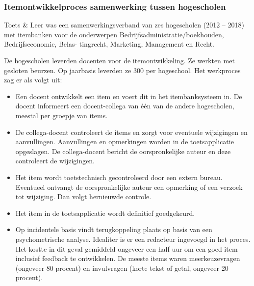 \documentclass[
]{book}
\providecommand{\tightlist}{%
  \setlength{\itemsep}{0pt}\setlength{\parskip}{0pt}}
\begin{document}
\hypertarget{itemontwikkelproces-samenwerking-tussen-hogescholen}{%
\subsubsection{Itemontwikkelproces samenwerking tussen hogescholen}\label{itemontwikkelproces-samenwerking-tussen-hogescholen}}

Toets \& Leer was een samenwerkingsverband van zes hogescholen (2012 -- 2018) met itembanken voor de onderwerpen Bedrijfsadministratie/boekhouden, Bedrijfseconomie, Belas- tingrecht, Marketing, Management en Recht.

De hogescholen leverden docenten voor de itemontwikkeling. Ze werkten met gesloten beurzen. Op jaarbasis leverden ze 300 per hogeschool. Het werkproces zag er als volgt uit:

\begin{itemize}
\tightlist
\item
  Een docent ontwikkelt een item en voert dit in het itembanksysteem in. De docent informeert een docent-collega van één van de andere hogescholen, meestal per groepje van items.
\item
  De collega-docent controleert de items en zorgt voor eventuele wijzigingen en aanvullingen. Aanvullingen en opmerkingen worden in de toetsapplicatie opgeslagen. De collega-docent bericht de oorspronkelijke auteur en deze controleert de wijzigingen.
\item
  Het item wordt toetstechnisch gecontroleerd door een extern bureau. Eventueel ontvangt de oorspronkelijke auteur een opmerking of een verzoek tot wijziging. Dan volgt hernieuwde controle.
\item
  Het item in de toetsapplicatie wordt definitief goedgekeurd.
\item
  Op incidentele basis vindt terugkoppeling plaats op basis van een psychometrische analyse.
  Idealiter is er een redacteur ingevoegd in het proces. Het kostte in dit geval gemiddeld ongeveer een half uur om een goed item inclusief feedback te ontwikkelen. De meeste items waren meerkeuzevragen (ongeveer 80 procent) en invulvragen (korte tekst of getal, ongeveer 20 procent).
\end{itemize}
\end{document}
